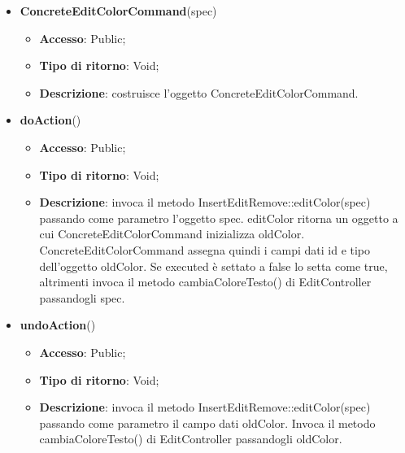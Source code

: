 {{{\begin{itemize}
\begin{itemize}
\begin{itemize}
\begin{itemize}
				\end{itemize}
			\end{itemize}
				\end{itemize}
				\end{itemize}
			\begin{itemize}
				\item \textbf{ConcreteEditColorCommand}(spec)
				\begin{itemize}
					\item \textbf{Accesso}: Public;
					\item \textbf{Tipo di ritorno}: Void;
					\item \textbf{Descrizione}: costruisce l’oggetto ConcreteEditColorCommand.
				\end{itemize}
				\item \textbf{doAction}()
				\begin{itemize}
					\item \textbf{Accesso}: Public;
					\item \textbf{Tipo di ritorno}: Void;
					\item \textbf{Descrizione}: invoca il metodo InsertEditRemove::editColor(spec) passando come parametro l'oggetto spec. editColor ritorna un oggetto a cui ConcreteEditColorCommand inizializza oldColor. ConcreteEditColorCommand assegna quindi i campi dati id e tipo dell'oggetto oldColor. Se executed è settato a false lo setta come true, altrimenti invoca il metodo cambiaColoreTesto() di EditController passandogli spec.
				\end{itemize}
				\item \textbf{undoAction}()
				\begin{itemize}
					\item \textbf{Accesso}: Public;
					\item \textbf{Tipo di ritorno}: Void;
					\item \textbf{Descrizione}: invoca il metodo InsertEditRemove::editColor(spec) passando come parametro il campo dati oldColor. Invoca il metodo cambiaColoreTesto() di EditController passandogli oldColor.
				\end{itemize}
			\end{itemize}
			}
			
}}

